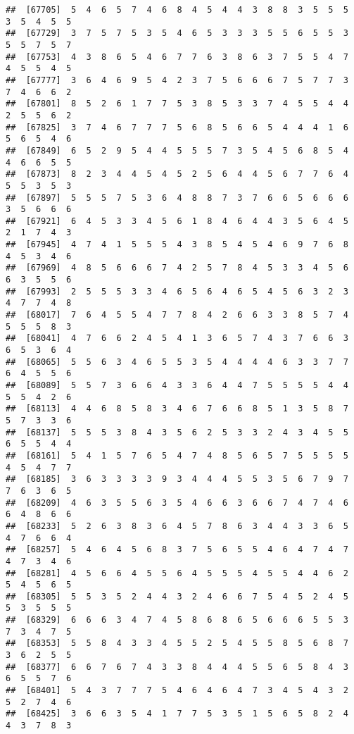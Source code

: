 \documentclass[
]{book}
\begin{document}
\begin{verbatim}
##  [67705]  5  4  6  5  7  4  6  8  4  5  4  4  3  8  8  3  5  5  5  3  5  4  5  5
##  [67729]  3  7  5  7  5  3  5  4  6  5  3  3  3  5  5  6  5  5  3  5  5  7  5  7
##  [67753]  4  3  8  6  5  4  6  7  7  6  3  8  6  3  7  5  5  4  7  4  5  5  4  5
##  [67777]  3  6  4  6  9  5  4  2  3  7  5  6  6  6  7  5  7  7  3  7  4  6  6  2
##  [67801]  8  5  2  6  1  7  7  5  3  8  5  3  3  7  4  5  5  4  4  2  5  5  6  2
##  [67825]  3  7  4  6  7  7  7  5  6  8  5  6  6  5  4  4  4  1  6  5  6  5  4  6
##  [67849]  6  5  2  9  5  4  4  5  5  5  7  3  5  4  5  6  8  5  4  4  6  6  5  5
##  [67873]  8  2  3  4  4  5  4  5  2  5  6  4  4  5  6  7  7  6  4  5  5  3  5  3
##  [67897]  5  5  5  7  5  3  6  4  8  8  7  3  7  6  6  5  6  6  6  3  5  6  6  6
##  [67921]  6  4  5  3  3  4  5  6  1  8  4  6  4  4  3  5  6  4  5  2  1  7  4  3
##  [67945]  4  7  4  1  5  5  5  4  3  8  5  4  5  4  6  9  7  6  8  4  5  3  4  6
##  [67969]  4  8  5  6  6  6  7  4  2  5  7  8  4  5  3  3  4  5  6  6  3  5  5  6
##  [67993]  2  5  5  5  3  3  4  6  5  6  4  6  5  4  5  6  3  2  3  4  7  7  4  8
##  [68017]  7  6  4  5  5  4  7  7  8  4  2  6  6  3  3  8  5  7  4  5  5  5  8  3
##  [68041]  4  7  6  6  2  4  5  4  1  3  6  5  7  4  3  7  6  6  3  6  5  3  6  4
##  [68065]  5  5  6  3  4  6  5  5  3  5  4  4  4  4  6  3  3  7  7  6  4  5  5  6
##  [68089]  5  5  7  3  6  6  4  3  3  6  4  4  7  5  5  5  5  4  4  5  5  4  2  6
##  [68113]  4  4  6  8  5  8  3  4  6  7  6  6  8  5  1  3  5  8  7  5  7  3  3  6
##  [68137]  5  5  5  3  8  4  3  5  6  2  5  3  3  2  4  3  4  5  5  6  5  5  4  4
##  [68161]  5  4  1  5  7  6  5  4  7  4  8  5  6  5  7  5  5  5  5  4  5  4  7  7
##  [68185]  3  6  3  3  3  3  9  3  4  4  4  5  5  3  5  6  7  9  7  7  6  3  6  5
##  [68209]  4  6  3  5  5  6  3  5  4  6  6  3  6  6  7  4  7  4  6  6  4  8  6  6
##  [68233]  5  2  6  3  8  3  6  4  5  7  8  6  3  4  4  3  3  6  5  4  7  6  6  4
##  [68257]  5  4  6  4  5  6  8  3  7  5  6  5  5  4  6  4  7  4  7  4  7  3  4  6
##  [68281]  4  5  6  6  4  5  5  6  4  5  5  5  4  5  5  4  4  6  2  5  4  5  6  5
##  [68305]  5  5  3  5  2  4  4  3  2  4  6  6  7  5  4  5  2  4  5  5  3  5  5  5
##  [68329]  6  6  6  3  4  7  4  5  8  6  8  6  5  6  6  6  5  5  3  7  3  4  7  5
##  [68353]  5  5  8  4  3  3  4  5  5  2  5  4  5  5  8  5  6  8  7  3  6  2  5  5
##  [68377]  6  6  7  6  7  4  3  3  8  4  4  4  5  5  6  5  8  4  3  6  5  5  7  6
##  [68401]  5  4  3  7  7  7  5  4  6  4  6  4  7  3  4  5  4  3  2  5  2  7  4  6
##  [68425]  3  6  6  3  5  4  1  7  7  5  3  5  1  5  6  5  8  2  4  4  3  7  8  3

\end{verbatim}
\end{document}
